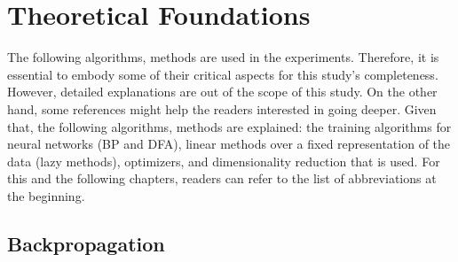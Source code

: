 \documentclass[a4paper, nobind]{templates/ociamthesis}
\begin{document}
\hypertarget{chap:chapter_1}{%
\chapter{Theoretical Foundations}\label{chap:chapter_1}}

\minitoc 
\noindent The following algorithms, methods are used in the experiments. Therefore, it is essential to embody some of their critical aspects for this study's completeness. However, detailed explanations are out of the scope of this study. On the other hand, some references might help the readers interested in going deeper. Given that, the following algorithms, methods are explained: the training algorithms for neural networks (BP and DFA), linear methods over a fixed representation of the data (lazy methods), optimizers, and dimensionality reduction that is used. For this and the following chapters, readers can refer to the list of abbreviations at the beginning.

\hypertarget{backpropagation}{%
\section{Backpropagation}\label{backpropagation}}
\end{document}
